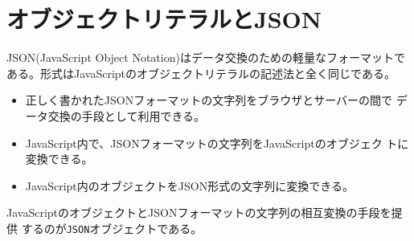 \section{オブジェクトリテラルとJSON}
JSON(JavaScript Object Notation)はデータ交換のための軽量なフォーマットで
ある。形式はJavaScriptのオブジェクトリテラルの記述法と全く同じである。
\begin{itemize}
 \item 正しく書かれたJSONフォーマットの文字列をブラウザとサーバーの間で
       データ交換の手段として利用できる。
 \item JavaScript内で、JSONフォーマットの文字列をJavaScriptのオブジェク
       トに変換できる。
 \item JavaScript内のオブジェクトをJSON形式の文字列に変換できる。
\end{itemize}

JavaScriptのオブジェクトとJSONフォーマットの文字列の相互変換の手段を提供
するのが\texttt{JSON}オブジェクトである。

